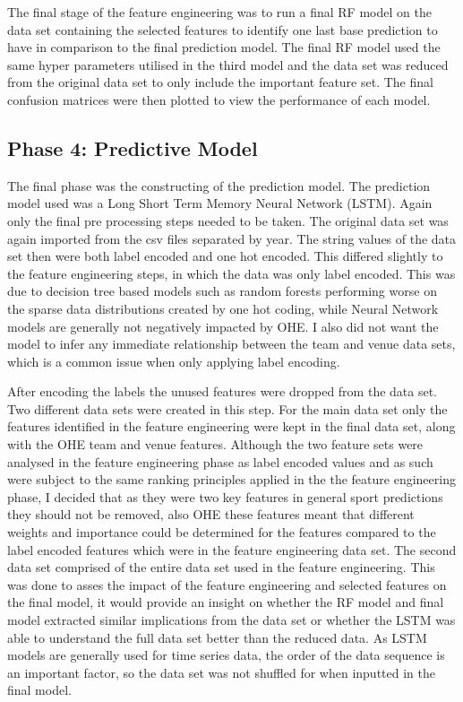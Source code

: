 \documentclass{imc-inf}
\begin{document}
	The final stage of the feature engineering was to run a final RF model on the data set containing the selected features to identify one last base prediction to have in comparison to the final prediction model. The final RF model used the same hyper parameters utilised in the third model and the data set was reduced from the original data set to only include the important feature set.
	The final confusion matrices were then plotted to view the performance of each model.
		
	\subsection{Phase 4: Predictive Model}
	The final phase was the constructing of the prediction model. The prediction model used was a Long Short Term Memory Neural Network (LSTM). Again only the final pre processing steps needed to be taken. The original data set was again imported from the csv files separated by year. The string values of the data set then were both label encoded and one hot encoded. This differed slightly to the feature engineering steps, in which the data was only label encoded. This was due to decision tree based models such as random forests performing worse on the sparse data distributions created by one hot coding, while Neural Network models are generally not negatively impacted by OHE. I also did not want the model to infer any immediate relationship between the team and venue data sets, which is a common issue when only applying label encoding. 
	\newline
	
	After encoding the labels the unused features were dropped from the data set. Two different data sets were created in this step. For the main data set only the features identified in the feature engineering were kept in the final data set, along with the OHE team and venue features. Although the two feature sets were analysed in the feature engineering phase as label encoded values and as such were subject to the same ranking principles applied in the the feature engineering phase, I decided that as they were two key features in general sport predictions they should not be removed, also OHE these features meant that different weights and importance could be determined for the features compared to the label encoded features which were in the feature engineering data set. The second data set comprised of the entire data set used in the feature engineering. This was done to asses the impact of the feature engineering and selected features on the final model, it would provide an insight on whether the RF model and final model extracted similar implications from the data set or whether the LSTM was able to understand the full data set better than the reduced data. As LSTM models are generally used for time series data, the order of the data sequence is an important factor, so the data set was not shuffled for when inputted in the final model.  	
	\newline
	
\end{document}
